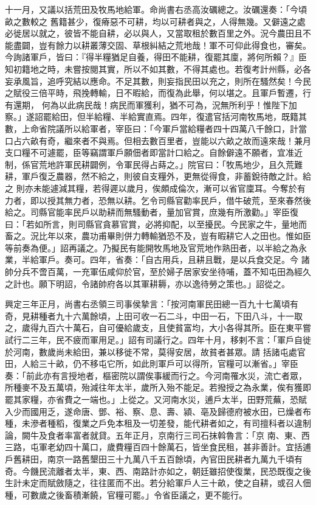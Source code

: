 \begin{pinyinscope}
 十一月，又議以括荒田及牧馬地給軍。命尚書右丞高汝礪總之。汝礪還奏：「今頃畝之數較之
 舊籍甚少，復瘠惡不可耕，均以可耕者與之，人得無幾。又僻遠之處必徙居以就之，彼皆不能自耕，必以與人，又當取租於數百里之外。況今農田且不能盡闢，豈有餘力以耕叢薄交固、草根糾結之荒地哉！軍不可仰此得食也，審矣。今詢諸軍戶，皆曰：『得半糧猶足自養，得田不能耕，復罷其廩，將何所賴？』臣知初籍地之時，未嘗按閱其實，所以不如其數，不得其處也。若復考計州縣，必各妄承風旨，追呼究結以應命。不足其數，則妄指民田以充之，則所在騷然矣！今民之賦役三倍平時，飛挽轉輸，日不暇給，而復為此舉，何以堪之。且軍戶暫遷，行有還期，
 何為以此病民哉！病民而軍獲利，猶不可為，況無所利乎！惟陛下加察。」遂詔罷給田，但半給糧、半給實直焉。四年，復遣官括河南牧馬地，既籍其數，上命省院議所以給軍者，宰臣曰：「今軍戶當給糧者四十四萬八千餘口，計當口占六畝有奇，繼來者不與焉。但相去數百里者，豈能以六畝之故而遠來哉！兼月支口糧不可遽罷，臣等竊謂軍戶願佃者即當計口給之。自餘僻遠不願者，宜准近制，係官荒地許軍民耕闢例，令軍民得占蒔之。」院官曰：「牧馬地少，且久荒難耕，軍戶復乏農器，然不給之，則彼自支糧外，更無從得食，非蓄銳待敵之計。給之
 則亦未能遽減其糧，若得遲以歲月，俟頗成倫次，漸可以省官廩耳。今奪於有力者，即以授其無力者，恐無以耕。乞令司縣官勸率民戶，借牛破荒，至來春然後給之。司縣官能率民戶以助耕而無騷動者，量加官賞，庶幾有所激勸。」宰臣復曰：「若如所言，則司縣官貪慕官賞，必將抑配，以至擾民。今民家之牛，量地而畜之。況比年以來，農功甫畢則併力轉輸猶恐不及，豈有暇耕它人之田也。惟如臣等前奏為便。」詔再議之。乃擬民有能開牧馬地及官荒地作熟田者，以半給之為永業，半給軍戶。奏可。四年，省奏：「自古用兵，且耕且戰，是以兵食交足。今
 諸帥分兵不啻百萬，一充軍伍咸仰於官，至於婦子居家安坐待哺，蓋不知屯田為經久之計也。願下明詔，令諸帥府各以其軍耕耨，亦以逸待勞之策也。」詔從之。



 興定三年正月，尚書右丞領三司事侯摯言：「按河南軍民田總一百九十七萬頃有奇，見耕種者九十六萬餘頃，上田可收一石二斗，中田一石，下田八斗，十一取之，歲得九百六十萬石，自可優給歲支，且使貧富均，大小各得其所。臣在東平嘗試行二三年，民不疲而軍用足。」詔有司議行之。四年十月，移剌不言：「軍戶自徙於河南，數歲尚未給田，兼以移徙不常，莫得安居，故貧者甚眾。請
 括諸屯處官田，人給三十畝，仍不移屯它所，如此則軍戶可以得所，官糧可以漸省。」宰臣奏：「前此亦有言授地者，樞密院以謂俟事緩而行之。今河南罹水災，流亡者眾，所種麥不及五萬頃，殆減往年太半，歲所入殆不能足。若撥授之為永業，俟有獲即罷其家糧，亦省費之一端也。」上從之。又河南水災，逋戶太半，田野荒蕪，恐賦入少而國用乏，遂命唐、鄧、裕、察、息、壽、潁、亳及歸德府被水田，已燥者布種，未滲者種稻，復業之戶免本租及一切差發，能代耕者如之，有司擅科者以違制論，闕牛及食者率富者就貸。五年正月，京南行三司石抹斡魯言：「京
 南、東、西三路，屯軍老幼四十萬口，歲費糧百四十餘萬石，皆坐食民租，甚非善計。宜括逋戶舊耕田，南京一路舊墾田三十九萬八千五百餘頃，內官田民耕者九萬九千頃有奇。今饑民流離者太半，東、西、南路計亦如之，朝廷雖招使復業，民恐既復之後生計未定而賦斂隨之，往往匿而不出。若分給軍戶人三十畝，使之自耕，或召人佃種，可數歲之後畜積漸饒，官糧可罷。」令省臣議之，更不能行。




\end{pinyinscope}

